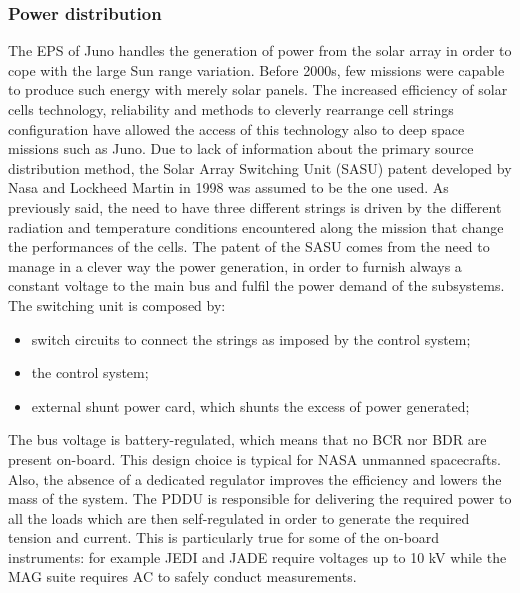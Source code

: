 \subsubsection{Power distribution}
\label{subsec: pwr_distribution}

The EPS of Juno handles the generation of power from the solar array  in order to cope with the large Sun range variation. Before 2000s, few missions were capable to produce such energy with merely solar panels. The increased efficiency of solar cells technology, reliability and methods to cleverly rearrange cell strings configuration have allowed the access of this technology also to deep space missions such as Juno. 
Due to lack of information about the primary source distribution method, the Solar Array Switching Unit (SASU) patent developed by Nasa and Lockheed Martin in 1998 was assumed to be the one used. \cite{sasu}
As previously said, the need to have three different strings is driven by the different radiation and temperature conditions encountered along the mission that change the performances of the cells. The patent of the SASU comes from the need to manage in a clever way the power generation, in order to furnish always a constant voltage to the main bus and fulfil the power demand of the subsystems. The switching unit is composed by:
\begin{itemize}
    \item switch circuits to connect the strings as imposed by the control system;
    \item the control system;
    \item external shunt power card, which shunts the excess of power generated;
\end{itemize}

The bus voltage is battery-regulated, which means that no BCR nor BDR are present on-board. \cite{bat_regulator}
This design choice is typical for NASA unmanned spacecrafts. \cite{systems_book}
Also, the absence of a dedicated regulator improves the efficiency and lowers the mass of the system.
The PDDU is responsible for delivering the required power to all the loads which are then self-regulated in order to generate the required tension and current. This is particularly true for some of the on-board instruments: for example JEDI\cite{JEDI_info} and JADE\cite{JADE_info} require voltages up to 10 kV while the MAG\cite{MAG_info} suite requires AC to safely conduct measurements.